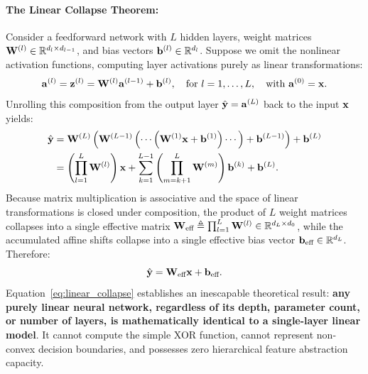 \paragraph{The Linear Collapse Theorem:}
Consider a feedforward network with $L$ hidden layers, weight matrices $\mathbf{W}^{(l)} \in \mathbb{R}^{d_l \times d_{l-1}}$, and bias vectors $\mathbf{b}^{(l)} \in \mathbb{R}^{d_l}$. Suppose we omit the nonlinear activation functions, computing layer activations purely as linear transformations:
\begin{equation}
\mathbf{a}^{(l)} = \mathbf{z}^{(l)} = \mathbf{W}^{(l)} \mathbf{a}^{(l-1)} + \mathbf{b}^{(l)}, \quad \text{for } l = 1, \dots, L, \quad \text{with } \mathbf{a}^{(0)} = \mathbf{x}.
\end{equation}
Unrolling this composition from the output layer $\hat{\mathbf{y}} = \mathbf{a}^{(L)}$ back to the input $\mathbf{x}$ yields:
\begin{align}
\hat{\mathbf{y}} &= \mathbf{W}^{(L)} \left( \mathbf{W}^{(L-1)} \left( \cdots \left( \mathbf{W}^{(1)} \mathbf{x} + \mathbf{b}^{(1)} \right) \cdots \right) + \mathbf{b}^{(L-1)} \right) + \mathbf{b}^{(L)} \notag \\
&= \left( \prod_{l=1}^L \mathbf{W}^{(l)} \right) \mathbf{x} + \sum_{k=1}^{L-1} \left( \prod_{m=k+1}^L \mathbf{W}^{(m)} \right) \mathbf{b}^{(k)} + \mathbf{b}^{(L)}.
\label{eq:linear_collapse_derivation}
\end{align}
Because matrix multiplication is associative and the space of linear transformations is closed under composition, the product of $L$ weight matrices collapses into a single effective matrix $\mathbf{W}_{\text{eff}} \triangleq \prod_{l=1}^L \mathbf{W}^{(l)} \in \mathbb{R}^{d_L \times d_0}$, while the accumulated affine shifts collapse into a single effective bias vector $\mathbf{b}_{\text{eff}} \in \mathbb{R}^{d_L}$. Therefore:
\begin{equation}
\hat{\mathbf{y}} = \mathbf{W}_{\text{eff}} \mathbf{x} + \mathbf{b}_{\text{eff}}.
\label{eq:linear_collapse}
\end{equation}
Equation~\eqref{eq:linear_collapse} establishes an inescapable theoretical result: \textbf{any purely linear neural network, regardless of its depth, parameter count, or number of layers, is mathematically identical to a single-layer linear model}. It cannot compute the simple XOR function, cannot represent non-convex decision boundaries, and possesses zero hierarchical feature abstraction capacity.

